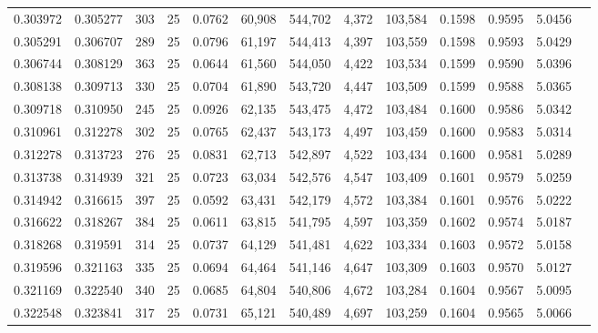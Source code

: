 \begin{tabular}{rrrrrrrrrrrrr}
0.303972 & 0.305277 &   303 &  25 &                                     0.0762 &  60,908 & 544,702 &   4,372 & 103,584 & 0.1598 & 0.9595 & 5.0456 \\
0.305291 & 0.306707 &   289 &  25 &                                     0.0796 &  61,197 & 544,413 &   4,397 & 103,559 & 0.1598 & 0.9593 & 5.0429 \\
0.306744 & 0.308129 &   363 &  25 &                                     0.0644 &  61,560 & 544,050 &   4,422 & 103,534 & 0.1599 & 0.9590 & 5.0396 \\
0.308138 & 0.309713 &   330 &  25 &                                     0.0704 &  61,890 & 543,720 &   4,447 & 103,509 & 0.1599 & 0.9588 & 5.0365 \\
0.309718 & 0.310950 &   245 &  25 &                                     0.0926 &  62,135 & 543,475 &   4,472 & 103,484 & 0.1600 & 0.9586 & 5.0342 \\
0.310961 & 0.312278 &   302 &  25 &                                     0.0765 &  62,437 & 543,173 &   4,497 & 103,459 & 0.1600 & 0.9583 & 5.0314 \\
0.312278 & 0.313723 &   276 &  25 &                                     0.0831 &  62,713 & 542,897 &   4,522 & 103,434 & 0.1600 & 0.9581 & 5.0289 \\
0.313738 & 0.314939 &   321 &  25 &                                     0.0723 &  63,034 & 542,576 &   4,547 & 103,409 & 0.1601 & 0.9579 & 5.0259 \\
0.314942 & 0.316615 &   397 &  25 &                                     0.0592 &  63,431 & 542,179 &   4,572 & 103,384 & 0.1601 & 0.9576 & 5.0222 \\
0.316622 & 0.318267 &   384 &  25 &                                     0.0611 &  63,815 & 541,795 &   4,597 & 103,359 & 0.1602 & 0.9574 & 5.0187 \\
0.318268 & 0.319591 &   314 &  25 &                                     0.0737 &  64,129 & 541,481 &   4,622 & 103,334 & 0.1603 & 0.9572 & 5.0158 \\
0.319596 & 0.321163 &   335 &  25 &                                     0.0694 &  64,464 & 541,146 &   4,647 & 103,309 & 0.1603 & 0.9570 & 5.0127 \\
0.321169 & 0.322540 &   340 &  25 &                                     0.0685 &  64,804 & 540,806 &   4,672 & 103,284 & 0.1604 & 0.9567 & 5.0095 \\
0.322548 & 0.323841 &   317 &  25 &                                     0.0731 &  65,121 & 540,489 &   4,697 & 103,259 & 0.1604 & 0.9565 & 5.0066 \\

\end{tabular}
